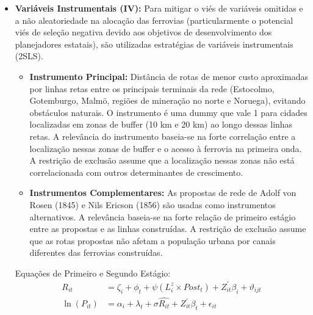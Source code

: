 \documentclass[12pt]{article}
\begin{document}
\begin{itemize}
\begin{equation}
        \ln(P_{it}) = \alpha_i + \lambda_t + \delta_t FW_i + Z_{i}^{\prime}\beta_{it} + \epsilon_{it}
    \end{equation}
    Onde:
    \begin{itemize}
        \item $\delta_t$: Coeficiente que representa a diferença média na população entre cidades com e sem acesso na primeira onda em relação ao ano base de 1855.
        \item Os demais termos são definidos de forma análoga, com $Z_i$ contendo controles geográficos interagidos com efeitos de década.
    \end{itemize}
    \item \textbf{Variáveis Instrumentais (IV):} Para mitigar o viés de variáveis omitidas e a não aleatoriedade na alocação das ferrovias (particularmente o potencial viés de seleção negativa devido aos objetivos de desenvolvimento dos planejadores estatais), são utilizadas estratégias de variáveis instrumentais (2SLS).
    \begin{itemize}
        \item \textbf{Instrumento Principal:} Distância de rotas de menor custo aproximadas por linhas retas entre os principais terminais da rede (Estocolmo, Gotemburgo, Malmö, regiões de mineração no norte e Noruega), evitando obstáculos naturais. O instrumento é uma dummy que vale 1 para cidades localizadas em zonas de buffer (10 km e 20 km) ao longo dessas linhas retas. A relevância do instrumento baseia-se na forte correlação entre a localização nessas zonas de buffer e o acesso à ferrovia na primeira onda. A restrição de exclusão assume que a localização nessas zonas não está correlacionada com outros determinantes de crescimento.
        \item \textbf{Instrumentos Complementares:} As propostas de rede de Adolf von Rosen (1845) e Nils Ericson (1856) são usadas como instrumentos alternativos. A relevância baseia-se na forte relação de primeiro estágio entre as propostas e as linhas construídas. A restrição de exclusão assume que as rotas propostas não afetam a população urbana por canais diferentes das ferrovias construídas.
    \end{itemize}
    Equações de Primeiro e Segundo Estágio:
    \begin{align}
        R_{it} &= \zeta_i + \phi_t + \psi(L_i^z \times Post_t) + Z_{it}^{\prime}\beta_i + \vartheta_{ijt} \label{eq:sweden_iv_first} \\
        \ln(P_{it}) &= \alpha_i + \lambda_t + \sigma \hat{R_{it}} + Z_{it}^{\prime}\beta_t + \epsilon_{it} \label{eq:sweden_iv_second}

\end{align}
\end{itemize}
\end{document}
